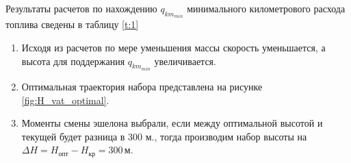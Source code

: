 Результаты расчетов по нахождению $q_{{km}_{min}}$ минимального километрового расхода топлива сведены в таблицу \ref{t:1}

\begin{enumerate}
\item Исходя из расчетов по мере уменьшения массы скорость уменьшается, а высота для поддержания $q_{{km}_{min}}$ увеличивается.
\item Оптимальная траектория набора представлена на рисунке \ref{fig:H_vat_optimal}.
\item Моменты смены эшелона выбрали, если между оптимальной высотой и текущей
    будет разница в 300 м., тогда производим набор высоты на $\Delta H = H_{опт}
    - H_{кр} = 300 \, м$.  
\end{enumerate}
